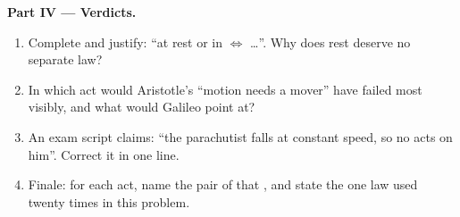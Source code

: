 \begin{problem}
\medskip
\noindent\textbf{Part IV --- Verdicts.}
\begin{enumerate}[resume]
  \item Complete and justify: ``at rest or in 
        $\iff$ \dots''. Why does rest deserve no separate law?
  \item In which act would Aristotle's ``motion needs a mover'' have
        failed most visibly, and what would Galileo point at?
  \item An exam script claims: ``the parachutist falls at constant
        speed, so no  acts on him''. Correct it in one line.
  \item Finale: for each act, name the pair of  that ,
        and state the one law used twenty times in this problem.
\end{enumerate}
\end{problem}
